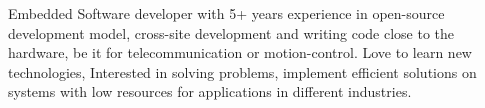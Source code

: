 

\begin{cvparagraph}

Embedded Software developer with 5+ years experience in open-source development model, cross-site development and writing code close to the hardware, be it for telecommunication or motion-control. Love to learn new technologies, Interested in solving problems, implement efficient solutions on systems with low resources for applications in different industries.
\end{cvparagraph}
